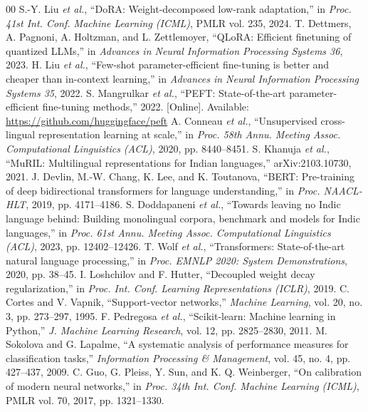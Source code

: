 \documentclass{svproc}
\begin{document}
\begin{thebibliography}{00}
 S.-Y. Liu \textit{et al.}, ``DoRA: Weight-decomposed low-rank adaptation,'' in \textit{Proc. 41st Int. Conf. Machine Learning (ICML)}, PMLR vol. 235, 2024.
 T. Dettmers, A. Pagnoni, A. Holtzman, and L. Zettlemoyer, ``QLoRA: Efficient finetuning of quantized LLMs,'' in \textit{Advances in Neural Information Processing Systems 36}, 2023.
 H. Liu \textit{et al.}, ``Few-shot parameter-efficient fine-tuning is better and cheaper than in-context learning,'' in \textit{Advances in Neural Information Processing Systems 35}, 2022.
 S. Mangrulkar \textit{et al.}, ``PEFT: State-of-the-art parameter-efficient fine-tuning methods,'' 2022. [Online]. Available: \url{https://github.com/huggingface/peft}
 A. Conneau \textit{et al.}, ``Unsupervised cross-lingual representation learning at scale,'' in \textit{Proc. 58th Annu. Meeting Assoc. Computational Linguistics (ACL)}, 2020, pp. 8440--8451.
 S. Khanuja \textit{et al.}, ``MuRIL: Multilingual representations for Indian languages,'' arXiv:2103.10730, 2021.
 J. Devlin, M.-W. Chang, K. Lee, and K. Toutanova, ``BERT: Pre-training of deep bidirectional transformers for language understanding,'' in \textit{Proc. NAACL-HLT}, 2019, pp. 4171--4186.
 S. Doddapaneni \textit{et al.}, ``Towards leaving no Indic language behind: Building monolingual corpora, benchmark and models for Indic languages,'' in \textit{Proc. 61st Annu. Meeting Assoc. Computational Linguistics (ACL)}, 2023, pp. 12402--12426.
 T. Wolf \textit{et al.}, ``Transformers: State-of-the-art natural language processing,'' in \textit{Proc. EMNLP 2020: System Demonstrations}, 2020, pp. 38--45.
 I. Loshchilov and F. Hutter, ``Decoupled weight decay regularization,'' in \textit{Proc. Int. Conf. Learning Representations (ICLR)}, 2019.
 C. Cortes and V. Vapnik, ``Support-vector networks,'' \textit{Machine Learning}, vol. 20, no. 3, pp. 273--297, 1995.
 F. Pedregosa \textit{et al.}, ``Scikit-learn: Machine learning in Python,'' \textit{J. Machine Learning Research}, vol. 12, pp. 2825--2830, 2011.
 M. Sokolova and G. Lapalme, ``A systematic analysis of performance measures for classification tasks,'' \textit{Information Processing \& Management}, vol. 45, no. 4, pp. 427--437, 2009.
 C. Guo, G. Pleiss, Y. Sun, and K. Q. Weinberger, ``On calibration of modern neural networks,'' in \textit{Proc. 34th Int. Conf. Machine Learning (ICML)}, PMLR vol. 70, 2017, pp. 1321--1330.

\end{thebibliography}
\end{document}
